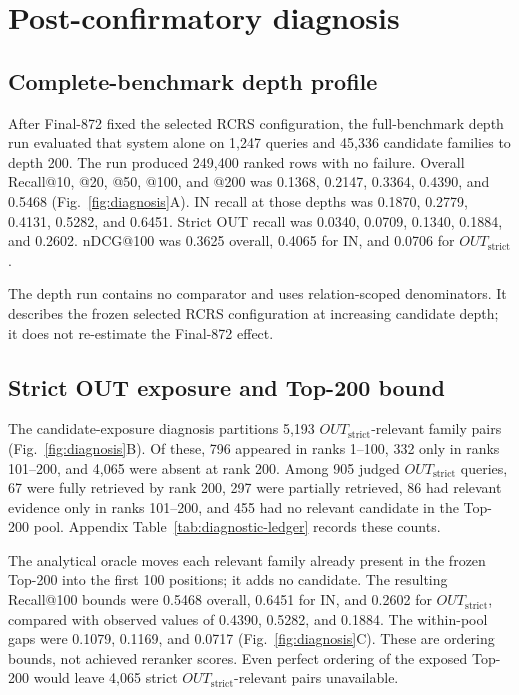 \documentclass[final,5p,times,twocolumn]{elsarticle}
\begin{document}
\section{Post-confirmatory diagnosis}

\subsection{Complete-benchmark depth profile}

After Final-872 fixed the selected RCRS configuration, the full-benchmark depth run evaluated that
system alone on 1,247 queries and 45,336 candidate families to depth 200. The run
produced 249,400 ranked rows with no failure. Overall Recall@10, @20, @50,
@100, and @200 was 0.1368, 0.2147,
0.3364, 0.4390, and 0.5468 (Fig.~\ref{fig:diagnosis}A). IN recall at those
depths was 0.1870, 0.2779, 0.4131, 0.5282, and 0.6451. Strict OUT recall was
0.0340, 0.0709, 0.1340, 0.1884, and 0.2602. nDCG@100 was 0.3625 overall,
0.4065 for IN, and 0.0706 for \ensuremath{OUT_{\mathrm{strict}}}.

The depth run contains no comparator and uses relation-scoped denominators. It describes
the frozen selected RCRS configuration at increasing candidate depth; it does not re-estimate the
Final-872 effect.

\subsection{Strict OUT exposure and Top-200 bound}

The candidate-exposure diagnosis partitions 5,193 \ensuremath{OUT_{\mathrm{strict}}}-relevant family pairs
(Fig.~\ref{fig:diagnosis}B). Of these, 796 appeared in ranks 1--100, 332 only
in ranks 101--200, and 4,065 were absent at rank 200. Among 905 judged
\ensuremath{OUT_{\mathrm{strict}}}
queries, 67 were fully retrieved by rank 200, 297 were partially retrieved,
86 had relevant evidence only in ranks 101--200, and 455 had no relevant
candidate in the Top-200 pool. Appendix Table~\ref{tab:diagnostic-ledger}
records these counts.

The analytical oracle moves each relevant family already present in the
frozen Top-200 into the first 100 positions; it adds no candidate. The
resulting Recall@100 bounds were 0.5468 overall, 0.6451 for IN, and 0.2602 for
\ensuremath{OUT_{\mathrm{strict}}}, compared with observed values of 0.4390, 0.5282, and 0.1884. The
within-pool gaps were 0.1079, 0.1169, and 0.0717
(Fig.~\ref{fig:diagnosis}C). These are ordering bounds, not achieved reranker
scores. Even perfect ordering of the exposed Top-200 would leave 4,065 strict
\ensuremath{OUT_{\mathrm{strict}}}-relevant pairs unavailable.
\end{document}
